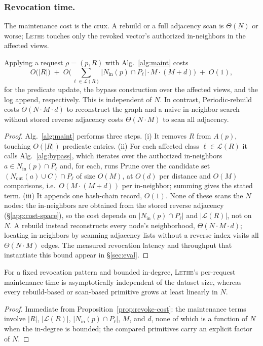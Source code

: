 \documentclass[sigconf, nonacm, review]{acmart}
\newcommand{\Nout}{N_{\mathrm{out}}}
\newcommand{\Nin}{N_{\mathrm{in}}}
\begin{document}
\subsubsection{Revocation time.}
\label{app:cost-revoke}
The maintenance cost is the crux. A rebuild or a full adjacency scan is
$\Theta(N)$ or worse; \textsc{Lethe} touches only the revoked vector's
authorized in-neighbors in the affected views.

\begin{proposition}
\label{prop:revoke-cost}
Applying a request $\rho=(p,R)$ with Alg.~\ref{alg:maint} costs
\[
O\!\big(|R|\big)\;+\;
O\!\Big(\textstyle\sum_{\ell\in\mathcal{L}(R)}
        |\Nin(p)\cap P_\ell|\cdot M\cdot(M+d)\Big)\;+\;O(1),
\]
for the predicate update, the bypass construction over the affected views, and
the log append, respectively. This is independent of $N$. In contrast,
Periodic-rebuild costs $\Theta(N\cdot M\cdot d)$ to reconstruct the graph and a
naive in-neighbor search without stored reverse adjacency costs $\Theta(N\cdot
M)$ to scan all adjacency.
\end{proposition}
\begin{proof}
Alg.~\ref{alg:maint} performs three steps. (i) It removes $R$ from $A(p)$,
touching $O(|R|)$ predicate entries. (ii) For each affected class
$\ell\in\mathcal{L}(R)$ it calls Alg.~\ref{alg:bypass}, which iterates over the
authorized in-neighbors $a\in\Nin(p)\cap P_\ell$ and, for each, runs
$\mathrm{Prune}$ over the candidate set $(\Nout(a)\cup C)\cap P_\ell$ of size
$O(M)$, at $O(d)$ per distance and $O(M)$ comparisons, i.e.\ $O(M\cdot(M+d))$
per in-neighbor; summing gives the stated term. (iii) It appends one hash-chain
record, $O(1)$. None of these scans the $N$ nodes: the in-neighbors are
obtained from the stored reverse adjacency (\S\ref{app:cost-space}), so the
cost depends on $|\Nin(p)\cap P_\ell|$ and $|\mathcal{L}(R)|$, not on $N$. A
rebuild instead reconstructs every node's neighborhood, $\Theta(N\cdot M\cdot
d)$; locating in-neighbors by scanning adjacency lists without a reverse index
visits all $\Theta(N\cdot M)$ edges. The measured revocation latency and
throughput that instantiate this bound appear in \S\ref{sec:eval}.
\end{proof}

\begin{corollary}
\label{cor:revoke-indep-N}
For a fixed revocation pattern and bounded in-degree, \textsc{Lethe}'s
per-request maintenance time is asymptotically independent of the dataset size,
whereas every rebuild-based or scan-based primitive grows at least linearly in
$N$.
\end{corollary}
\begin{proof}
Immediate from Proposition~\ref{prop:revoke-cost}: the maintenance terms involve
$|R|$, $|\mathcal{L}(R)|$, $|\Nin(p)\cap P_\ell|$, $M$, and $d$, none of which
is a function of $N$ when the in-degree is bounded; the compared primitives
carry an explicit factor of $N$.
\end{proof}
\end{document}
